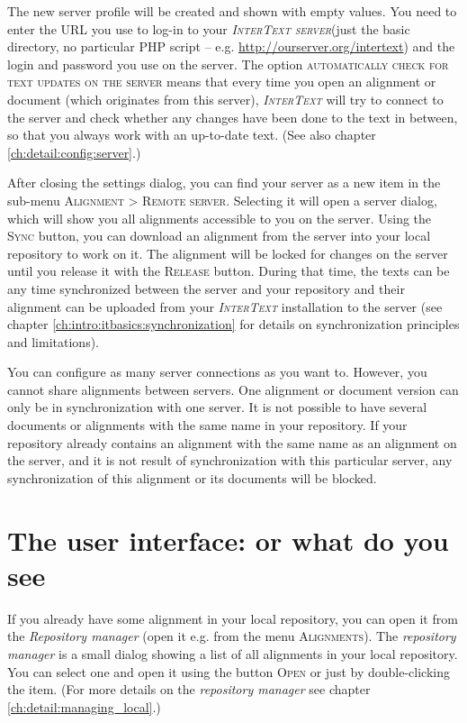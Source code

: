 \documentclass[a4paper,10pt,oneside]{book}
\newcommand{\IT}{\textit{\textsc{InterText}}\xspace}
\newcommand{\ITserver}{\textit{\textsc{InterText server}}\xspace}
\newcommand{\menu}[1]{\textsc{#1}}
\begin{document}
The new server profile will be created and shown with empty values. You need to enter the URL you use to log-in to your \ITserver (just the basic directory, no particular PHP script -- e.g. \url{http://ourserver.org/intertext}) and the login and password you use on the server. The option \menu{automatically check for text updates on the server} means that every time you open an alignment or document (which originates from this server), \IT will try to connect to the server and check whether any changes have been done to the text in between, so that you always work with an up-to-date text. (See also chapter \ref{ch:detail:config:server}.)

After closing the settings dialog, you can find your server as a new item in the sub-menu \menu{Alignment} > \menu{Remote server}. Selecting it will open a server dialog, which will show you all alignments accessible to you on the server. Using the \menu{Sync} button, you can download an alignment from the server into your local repository to work on it. The alignment will be locked for changes on the server until you release it with the \menu{Release} button. During that time, the texts can be any time synchronized between the server and your repository and their alignment can be uploaded from your \IT installation to the server (see chapter \ref{ch:intro:itbasics:synchronization} for details on synchronization principles and limitations).

You can configure as many server connections as you want to. However, you cannot share alignments between servers. One alignment or document version can only be in synchronization with one server. It is not possible to have several documents or alignments with the same name in your repository. If your repository already contains an alignment with the same name as an alignment on the server, and it is not result of synchronization with this particular server, any synchronization of this alignment or its documents will be blocked.

\chapter{The user interface: or what do you see}\label{ch:howto:interface}

If you already have some alignment in your local repository, you can open it from the \emph{Repository manager} (open it e.g. from the menu \menu{Alignments}). The \emph{repository manager} is a small dialog showing a list of all alignments in your local repository. You can select one and open it using the button \menu{Open} or just by double-clicking the item. (For more details on the \emph{repository manager} see chapter \ref{ch:detail:managing_local}.)
\end{document}
